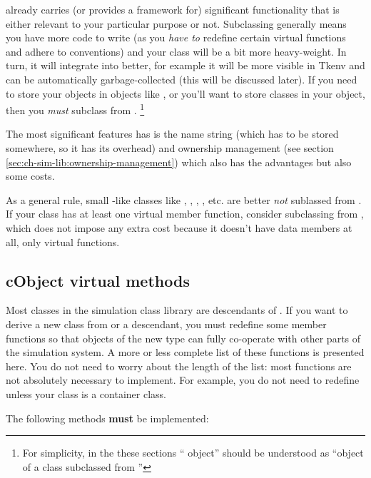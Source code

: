  already carries (or provides a framework for)
significant functionality that is either relevant to
your particular purpose or not. Subclassing 
generally means you have more code to write (as you \textit{have to}
redefine certain virtual functions and adhere to conventions)
and your class will be a bit more heavy-weight.
In turn, it will integrate into {\opp} better, for example
it will be more visible in Tkenv and can be automatically
garbage-collected (this will be discussed later). If you
need to store your objects in {\opp} objects like ,
or you'll want to store {\opp} classes in your object,
then you \textit{must} subclass from .
  \footnote{For simplicity, in the these sections ``{\opp} object''
  should be understood as ``object of a class subclassed from
  ''}

The most significant features  has is
the name string (which has to be stored somewhere, so it has
its overhead) and ownership management (see section
\ref{sec:ch-sim-lib:ownership-management}) which
also has the advantages but also some costs.

As a general rule, small -like classes like ,
, , , etc.
are better \textit{not} sublassed from .
If your class has at least one virtual member function, consider
subclassing from , which does not impose any
extra cost because it doesn't have data members at all, only
virtual functions.


\subsection{cObject virtual methods}

Most classes in the simulation class library are descendants of
. If you want to derive a new class from
 or a  descendant, you must redefine
some member functions so that objects of the new type can fully
co-operate with other parts of the simulation system. A more or less
complete list of these functions is presented here. You do not need to
worry about the length of the list: most functions are not
absolutely necessary to implement. For example, you do not need to
redefine  unless your class is a container class.

The following methods \textbf{must} be implemented:

